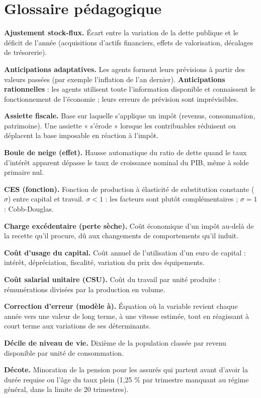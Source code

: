 \documentclass[
  11pt,
  11pt,
  a4paper,
  openany]{book}
\begin{document}
\hypertarget{sec:annexe-i}{%
\chapter{Glossaire pédagogique}\label{sec:annexe-i}}

\textbf{Ajustement stock-flux.} Écart entre la variation de la dette
publique et le déficit de l'année (acquisitions d'actifs financiers,
effets de valorisation, décalages de trésorerie).

\textbf{Anticipations adaptatives.} Les agents forment leurs prévisions
à partir des valeurs passées (par exemple l'inflation de l'an dernier).
\textbf{Anticipations rationnelles} : les agents utilisent toute
l'information disponible et connaissent le fonctionnement de l'économie
; leurs erreurs de prévision sont imprévisibles.

\textbf{Assiette fiscale.} Base sur laquelle s'applique un impôt
(revenus, consommation, patrimoine). Une assiette « s'érode » lorsque
les contribuables réduisent ou déplacent la base imposable en réaction à
l'impôt.

\textbf{Boule de neige (effet).} Hausse automatique du ratio de dette
quand le taux d'intérêt apparent dépasse le taux de croissance nominal
du PIB, même à solde primaire nul.

\textbf{CES (fonction).} Fonction de production à élasticité de
substitution constante (\(\sigma\)) entre capital et travail.
\(\sigma < 1\) : les facteurs sont plutôt complémentaires ;
\(\sigma = 1\) : Cobb-Douglas.

\textbf{Charge excédentaire (perte sèche).} Coût économique d'un impôt
au-delà de la recette qu'il procure, dû aux changements de comportements
qu'il induit.

\textbf{Coût d'usage du capital.} Coût annuel de l'utilisation d'un euro
de capital : intérêt, dépréciation, fiscalité, variation du prix des
équipements.

\textbf{Coût salarial unitaire (CSU).} Coût du travail par unité
produite : rémunérations divisées par la production en volume.

\textbf{Correction d'erreur (modèle à).} Équation où la variable revient
chaque année vers une valeur de long terme, à une vitesse estimée, tout
en réagissant à court terme aux variations de ses déterminants.

\textbf{Décile de niveau de vie.} Dixième de la population classée par
revenu disponible par unité de consommation.

\textbf{Décote.} Minoration de la pension pour les assurés qui partent
avant d'avoir la durée requise ou l'âge du taux plein (1,25 \% par
trimestre manquant au régime général, dans la limite de 20 trimestres).
\end{document}

